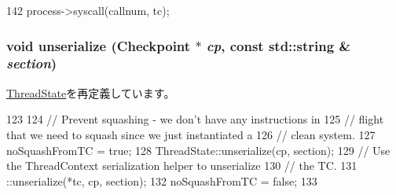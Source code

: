 \begin{DoxyCode}
142 { process->syscall(callnum, tc); }
\end{DoxyCode}
\hypertarget{structO3ThreadState_af22e5d6d660b97db37003ac61ac4ee49}{
\subsubsection[{unserialize}]{\setlength{\rightskip}{0pt plus 5cm}void unserialize ({\bf Checkpoint} $\ast$ {\em cp}, \/  const std::string \& {\em section})}}
\label{structO3ThreadState_af22e5d6d660b97db37003ac61ac4ee49}


\hyperlink{structThreadState_af22e5d6d660b97db37003ac61ac4ee49}{ThreadState}を再定義しています。


\begin{DoxyCode}
123     {
124         // Prevent squashing - we don't have any instructions in
125         // flight that we need to squash since we just instantiated a
126         // clean system.
127         noSquashFromTC = true;
128         ThreadState::unserialize(cp, section);
129         // Use the ThreadContext serialization helper to unserialize
130         // the TC.
131         ::unserialize(*tc, cp, section);
132         noSquashFromTC = false;
133     }
\end{DoxyCode}


